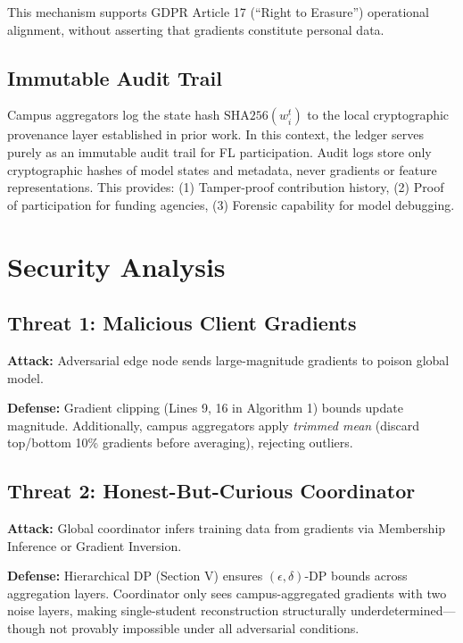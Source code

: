\documentclass[conference]{IEEEtran}
\begin{document}
This mechanism supports GDPR Article 17 (``Right to Erasure'') operational alignment, without asserting that gradients constitute personal data.

\subsection{Immutable Audit Trail}

Campus aggregators log the state hash $\text{SHA256}(w_i^t)$ to the local cryptographic provenance layer established in prior work. In this context, the ledger serves purely as an immutable audit trail for FL participation. Audit logs store only cryptographic hashes of model states and metadata, never gradients or feature representations. This provides: (1) Tamper-proof contribution history, (2) Proof of participation for funding agencies, (3) Forensic capability for model debugging.

\section{Security Analysis}

\subsection{Threat 1: Malicious Client Gradients}

\textbf{Attack:} Adversarial edge node sends large-magnitude gradients to poison global model.

\textbf{Defense:} Gradient clipping (Lines 9, 16 in Algorithm 1) bounds update magnitude. Additionally, campus aggregators apply \textit{trimmed mean} (discard top/bottom 10\% gradients before averaging), rejecting outliers.

\subsection{Threat 2: Honest-But-Curious Coordinator}

\textbf{Attack:} Global coordinator infers training data from gradients via Membership Inference or Gradient Inversion.

\textbf{Defense:} Hierarchical DP (Section V) ensures $(\epsilon, \delta)$-DP bounds across aggregation layers. Coordinator only sees campus-aggregated gradients with two noise layers, making single-student reconstruction structurally underdetermined---though not provably impossible under all adversarial conditions.
\end{document}
